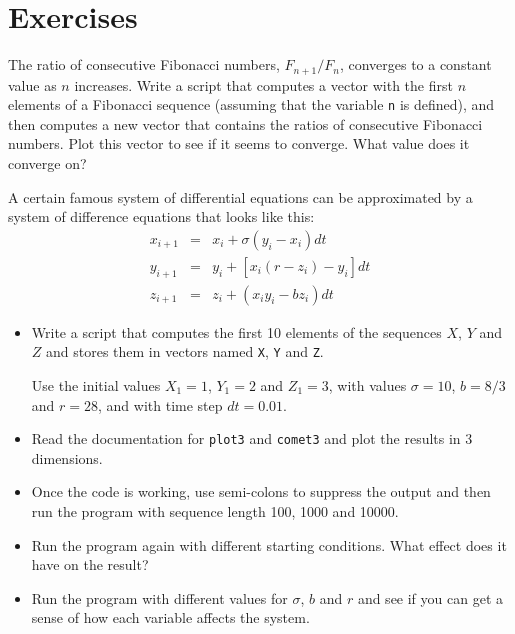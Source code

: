 \documentclass{book}
\begin{document}
\section{Exercises}

\begin{ex}
\label{fibratio}

The ratio of consecutive Fibonacci numbers, $F_{n+1}/F_{n}$, converges
to a constant value as $n$ increases.  Write a script that computes
a vector with the first $n$ elements of a Fibonacci sequence (assuming
that the variable {\tt n} is defined), and then computes a new
vector that contains the ratios of consecutive Fibonacci numbers.
Plot this vector to see if it seems to converge.  What value does
it converge on?

\end{ex}

\begin{ex}
A certain famous system of differential equations can be approximated
by a system of difference equations that looks like this:
%
\begin{eqnarray}
x_{i+1} &=& x_i + \sigma \left( y_i - x_i \right) dt  \\
y_{i+1} &=& y_i + \left[ x_i (r - z_i) - y_i \right] dt   \\
z_{i+1} &=& z_i + \left( x_i y_i - b z_i \right) dt
\end{eqnarray}
%
\begin{itemize}

\item Write a script that computes the first 10 elements of the sequences
$X$, $Y$ and $Z$ and stores them in vectors named {\tt X}, {\tt Y}
and {\tt Z}.

Use the initial values $X_1 = 1$, $Y_1 = 2$ and $Z_1 = 3$, with values
$\sigma = 10$, $b = 8/3$ and $r = 28$, and with time step $dt = 0.01$.

\item Read the documentation for {\tt plot3} and {\tt comet3} and
plot the results in 3 dimensions.

\item Once the code is working, use semi-colons to suppress the output
and then run the program with sequence length 100, 1000 and 10000.

\item Run the program again with different starting conditions.
What effect does it have on the result?

\item Run the program with different values for $\sigma$, $b$ and $r$
and see if you can get a sense of how each variable affects the
system.

\end{itemize}

\end{ex}
\end{document}
